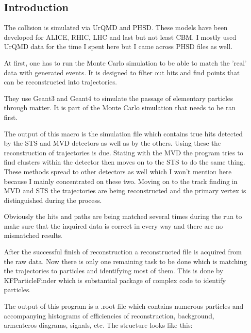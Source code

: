 \documentclass[a4paper,12pt]{article}
\begin{document}
\subsection{ Introduction}
\vspace{5mm}
\par The collision is simulated via UrQMD and PHSD. These models have been developed for ALICE, RHIC, LHC and last but not least CBM. I mostly used UrQMD data for the time I spent here but I came across PHSD files as well.
\vspace{5mm}
\par At first, one has to run the Monte Carlo simulation to be able to match the 'real' data with generated events. It is designed to filter out hits and find points that can be reconstructed into trajectories.
\vspace{5mm}
\par They use Geant3 and Geant4 to simulate the passage of elementary particles through matter. It is part of the Monte Carlo simulation that needs to be ran first.
\vspace{5mm}
\par The output of this macro is the simulation file which contains true hits detected by the STS and MVD detectors as well as by the others. Using these the reconstruction of trajectories is due. Stating with the MVD the program tries to find clusters within the detector then moves on to the STS to do the same thing. These methods spread to other detectors as well which I won't mention here because I mainly concentrated on these two. Moving on to the track finding in MVD and STS the trajectories are being reconstructed and the primary vertex is distinguished during the process. 
\vspace{5mm}
\par Obviously the hits and paths are being matched several times during the run to make sure that the inquired data is correct in every way and there are no mismatched results. 
\vspace{5mm}
\par After the successful finish of reconstruction a reconstructed file is acquired from the raw data. Now there is only one remaining task to be done which is matching the trajectories to particles and identifying most of them. This is done by KFParticleFinder which is substantial package of complex code to identify particles.
\vspace{5mm}
\par The output of this program is a .root file which contains numerous particles and accompanying histograms of efficiencies of reconstruction, background, armenteros diagrams, signals, etc. The structure looks like this:
\end{document}
